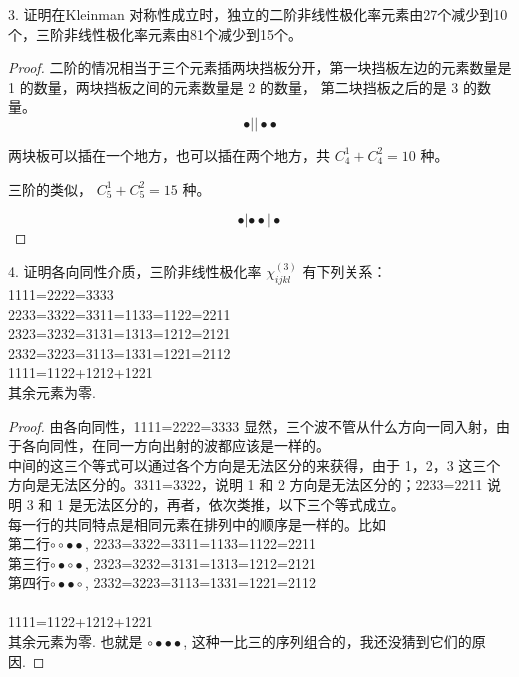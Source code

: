 \begin{exercise}

3. 证明在Kleinman 对称性成立时，独立的二阶非线性极化率元素由27个减少到10个，三阶非线性极化率元素由81个减少到15个。
\end{exercise}


\begin{proof}
二阶的情况相当于三个元素插两块挡板分开，第一块挡板左边的元素数量是 1 的数量，两块挡板之间的元素数量是 2 的数量， 第二块挡板之后的是 3 的数量。
$$\bullet ||\bullet \bullet$$

两块板可以插在一个地方，也可以插在两个地方，共 $C_4^1+C_4^2=10$ 种。

三阶的类似， $C_5^1+C_5^2=15$ 种。

$$\bullet |\bullet \bullet |\bullet$$
\end{proof}

\begin{exercise}

4.   证明各向同性介质，三阶非线性极化率 $\chi_{ijkl}^{(3)}$ 有下列关系：\\
1111=2222=3333\\
2233=3322=3311=1133=1122=2211\\
2323=3232=3131=1313=1212=2121\\
2332=3223=3113=1331=1221=2112\\
1111=1122+1212+1221\\
其余元素为零. 
\end{exercise}

\begin{proof}
由各向同性，1111=2222=3333 显然，三个波不管从什么方向一同入射，由于各向同性，在同一方向出射的波都应该是一样的。\\
中间的这三个等式可以通过各个方向是无法区分的来获得，由于 1，2，3 这三个方向是无法区分的。3311=3322，说明 1 和 2 方向是无法区分的；2233=2211 说明 3 和 1 是无法区分的，再者，依次类推，以下三个等式成立。 \\
每一行的共同特点是相同元素在排列中的顺序是一样的。比如\\
第二行$\circ\circ\bullet\bullet$,  2233=3322=3311=1133=1122=2211\\
第三行$\circ\bullet\circ\bullet$,  2323=3232=3131=1313=1212=2121\\
第四行$\circ\bullet\bullet\circ$,  2332=3223=3113=1331=1221=2112\\
\\ 

1111=1122+1212+1221\\
其余元素为零. 也就是 $\circ\bullet\bullet\bullet$, 这种一比三的序列组合的，我还没猜到它们的原因.
\end{proof}

